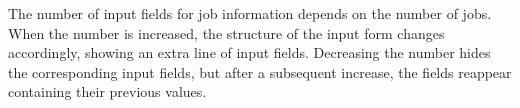 \documentclass{speauth}
\begin{document}

The number of input fields for job information depends on the number of jobs. When the number is increased, the structure of the input form changes accordingly, showing an extra line of input fields. Decreasing the number hides the corresponding input fields, but after a subsequent increase, the fields reappear containing their previous values.
\end{document}

